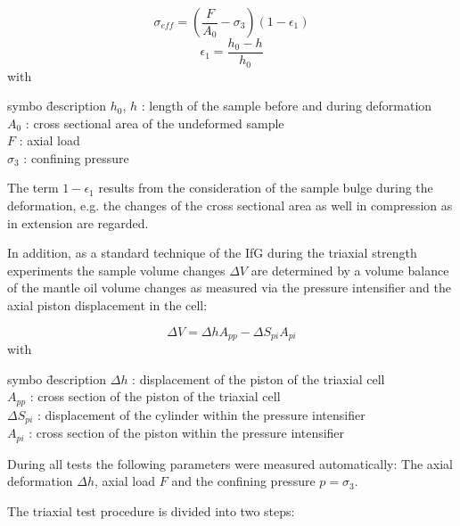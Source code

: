 \begin{equation}
\sigma_{eff} = \left(  \frac{F}{A_0}-\sigma_3 \right) (1-\epsilon_1)
\end{equation}
\begin{equation}
\epsilon_1 = \frac{h_0-h}{h_0}
\end{equation}
with
\begin{tabbing}
symbo \= description \kill
$h_0$, $h$ : \> length of the sample before and during deformation \\
$A_0$ : \> cross sectional area of the undeformed sample \\
$F$ : \> axial load  \\
$\sigma_3$ : \> confining pressure 
\end{tabbing}

The term $1-\epsilon_1$ results from the consideration of the sample bulge during the deformation, e.g. the changes of the cross sectional area as well in compression as in extension are regarded.

In addition, as a standard technique of the IfG during the triaxial strength experiments the sample volume changes $\Delta V$ are determined by a volume balance of the mantle oil volume changes as measured via the pressure intensifier and the axial piston displacement in the cell:

\begin{equation}
\Delta V = \Delta h A_{pp} -\Delta S_{pi} A_{pi}
\end{equation}
with
\begin{tabbing}
symbo \= description \kill
$\Delta h$ : \> displacement of the piston of the triaxial cell \\
$A_{pp}$ : \> cross section of the piston of the triaxial cell \\
$\Delta S_{pi}$ : \> displacement of the cylinder within the pressure intensifier \\
$A_{pi}$ : \> cross section of the piston within the pressure intensifier \\
\end{tabbing}

During all tests the following parameters were measured automatically: The axial deformation $\Delta h$, axial load $F$ and the confining pressure $p = \sigma_3$. 

The triaxial test procedure is divided into two steps:

